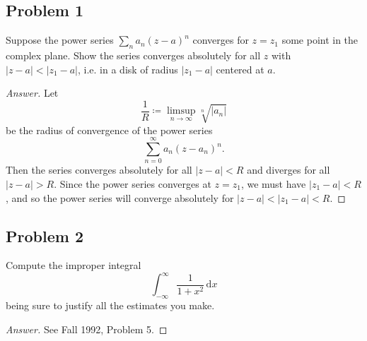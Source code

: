 \documentclass[12pt]{article}
\newcommand\paren[1]{\left( #1 \right)}
\newcommand{\abs}[1]{\left| #1 \right|}
\renewcommand{\i}[4]{\int_{#1}^{#2} {#3} \, \mathrm{d} {#4} }
\theoremstyle{definition}
\begin{document}
\subsection{Problem 1}
Suppose the power series $\sum_n a_n (z - a)^n$ converges for $z = z_1$ some point in the complex plane. Show the series converges absolutely for all $z$ with $\abs{z - a} < \abs{z_1 - a}$, i.e. in a disk of radius $\abs{z_1 - a}$ centered at $a$.
\begin{proof}[Answer]
    Let 
    \[
        \frac{1}{R} \coloneqq \limsup\limits_{n \to \infty} \sqrt[n]{ \abs{ a_n } }
    \]
    be the radius of convergence of the power series
    \[
        \sum\limits_{n = 0}^{\infty} a_n \paren{ z - a_n }^n . 
    \]
    Then the series converges absolutely for all $\abs{z - a} < R$ and diverges for all $\abs{z - a} > R$. Since the power series converges at $z = z_1$, we must have $\abs{z_1 - a} < R$, and so the power series will converge absolutely for $\abs{z - a} < \abs{z_1 - a} < R$. 
\end{proof}

\subsection{Problem 2}
Compute the improper integral 
\[
    \i{-\infty}{\infty}{\frac{1}{1+x^2}}{x}
\]
being sure to justify all the estimates you make. 
\begin{proof}[Answer]
    See Fall 1992, Problem 5. 
\end{proof}
\end{document}

